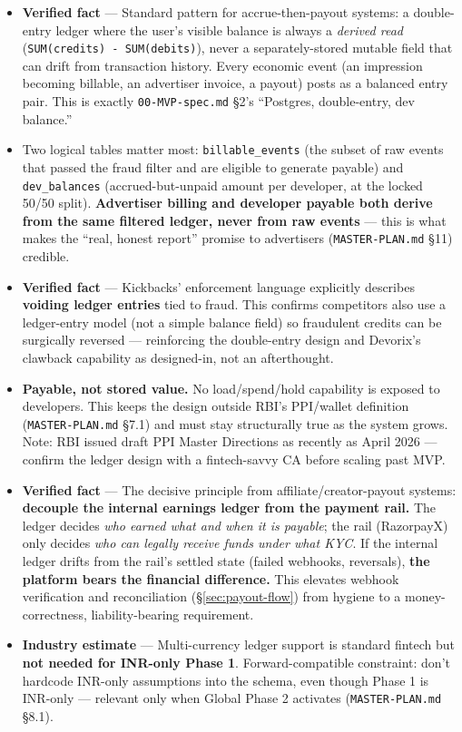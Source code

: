 \begin{itemize}
  \item \textbf{Verified fact} \citep{moderntreasury_2026, sdkfinance_2026} --- Standard pattern for accrue-then-payout systems: a double-entry ledger where the user's visible balance is always a \textit{derived read} (\texttt{SUM(credits) - SUM(debits)}), never a separately-stored mutable field that can drift from transaction history. Every economic event (an impression becoming billable, an advertiser invoice, a payout) posts as a balanced entry pair. This is exactly \texttt{00-MVP-spec.md} \S2's ``Postgres, double-entry, dev balance.''
  \item Two logical tables matter most: \texttt{billable\_events} (the subset of raw events that passed the fraud filter and are eligible to generate payable) and \texttt{dev\_balances} (accrued-but-unpaid amount per developer, at the locked 50/50 split). \textbf{Advertiser billing and developer payable both derive from the same filtered ledger, never from raw events} --- this is what makes the ``real, honest report'' promise to advertisers (\texttt{MASTER-PLAN.md} \S11) credible.
  \item \textbf{Verified fact} \citep{kickbacks_faq_2026} --- Kickbacks' enforcement language explicitly describes \textbf{voiding ledger entries} tied to fraud. This confirms competitors also use a ledger-entry model (not a simple balance field) so fraudulent credits can be surgically reversed --- reinforcing the double-entry design and Devorix's clawback capability as designed-in, not an afterthought.
  \item \textbf{Payable, not stored value.} No load/spend/hold capability is exposed to developers. This keeps the design outside RBI's PPI/wallet definition (\texttt{MASTER-PLAN.md} \S7.1) and must stay structurally true as the system grows. Note: RBI issued draft PPI Master Directions as recently as April 2026 --- confirm the ledger design with a fintech-savvy CA before scaling past MVP.
  \item \textbf{Verified fact} \citep{refgrow_2026} --- The decisive principle from affiliate/creator-payout systems: \textbf{decouple the internal earnings ledger from the payment rail.} The ledger decides \textit{who earned what and when it is payable}; the rail (RazorpayX) only decides \textit{who can legally receive funds under what KYC}. If the internal ledger drifts from the rail's settled state (failed webhooks, reversals), \textbf{the platform bears the financial difference.} This elevates webhook verification and reconciliation (\S\ref{sec:payout-flow}) from hygiene to a money-correctness, liability-bearing requirement.
  \item \textbf{Industry estimate} \citep{sdkfinancemulticurrency_2026} --- Multi-currency ledger support is standard fintech but \textbf{not needed for INR-only Phase 1}. Forward-compatible constraint: don't hardcode INR-only assumptions into the schema, even though Phase 1 is INR-only --- relevant only when Global Phase 2 activates (\texttt{MASTER-PLAN.md} \S8.1).
\end{itemize}

